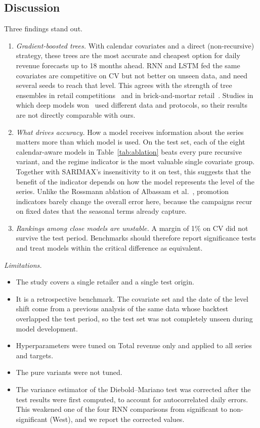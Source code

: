 \documentclass[conference]{IEEEtran}
\begin{document}
\subsection{Discussion}
Three findings stand out.
\begin{enumerate}
\item \emph{Gradient-boosted trees.} With calendar covariates and a direct (non-recursive) strategy, these trees are the most accurate and cheapest option for daily revenue forecasts up to 18 months ahead. RNN and LSTM fed the same covariates are competitive on CV but not better on unseen data, and need several seeds to reach that level. This agrees with the strength of tree ensembles in retail competitions~\cite{makridakis2022m5,januschowski2022trees} and in brick-and-mortar retail~\cite{hobor2026comparative}. Studies in which deep models won~\cite{ensafi2022seasonal,theodoridis2025lstmixer} used different data and protocols, so their results are not directly comparable with ours.
\item \emph{What drives accuracy.} How a model receives information about the series matters more than which model is used. On the test set, each of the eight calendar-aware models in Table~\ref{tab:ablation} beats every pure recursive variant, and the regime indicator is the most valuable single covariate group. Together with SARIMAX's insensitivity to it on test, this suggests that the benefit of the indicator depends on how the model represents the level of the series. Unlike the Rossmann ablation of Albassam et al.~\cite{albassam2026tree}, promotion indicators barely change the overall error here, because the campaigns recur on fixed dates that the seasonal terms already capture.
\item \emph{Rankings among close models are unstable.} A margin of 1\% on CV did not survive the test period. Benchmarks should therefore report significance tests and treat models within the critical difference as equivalent.
\end{enumerate}

\emph{Limitations.}
\begin{itemize}
\item The study covers a single retailer and a single test origin.
\item It is a retrospective benchmark. The covariate set and the date of the level shift come from a previous analysis of the same data whose backtest overlapped the test period, so the test set was not completely unseen during model development.
\item Hyperparameters were tuned on Total revenue only and applied to all series and targets.
\item The pure variants were not tuned.
\item The variance estimator of the Diebold--Mariano test was corrected after the test results were first computed, to account for autocorrelated daily errors. This weakened one of the four RNN comparisons from significant to non-significant (West), and we report the corrected values.
\end{itemize}
\end{document}
